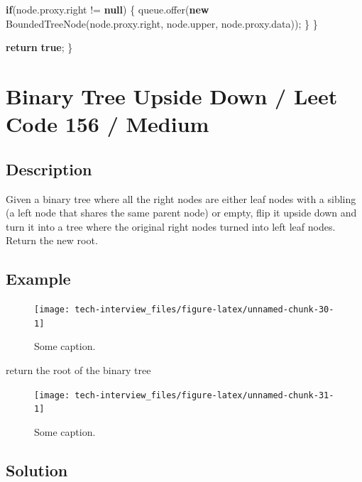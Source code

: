 \documentclass[]{book}
\newenvironment{Shaded}{\begin{snugshade}}{\end{snugshade}}
\newcommand{\FunctionTok}[1]{\textcolor[rgb]{0.00,0.00,0.00}{#1}}
\newcommand{\KeywordTok}[1]{\textcolor[rgb]{0.13,0.29,0.53}{\textbf{#1}}}
\newcommand{\NormalTok}[1]{#1}
\begin{document}
\begin{Shaded}
\begin{Highlighting}[]
        \KeywordTok{if}\NormalTok{(node.}\FunctionTok{proxy}\NormalTok{.}\FunctionTok{right}\NormalTok{ != }\KeywordTok{null}\NormalTok{) \{}
\NormalTok{            queue.}\FunctionTok{offer}\NormalTok{(}\KeywordTok{new} \FunctionTok{BoundedTreeNode}\NormalTok{(node.}\FunctionTok{proxy}\NormalTok{.}\FunctionTok{right}\NormalTok{, node.}\FunctionTok{upper}\NormalTok{, node.}\FunctionTok{proxy}\NormalTok{.}\FunctionTok{data}\NormalTok{));}
\NormalTok{        \}}
\NormalTok{    \}}

    \KeywordTok{return} \KeywordTok{true}\NormalTok{;}
\NormalTok{\}}
\end{Highlighting}
\end{Shaded}

\hypertarget{binary-tree-upside-down-leet-code-156-medium}{%
\section{Binary Tree Upside Down / Leet Code 156 / Medium}\label{binary-tree-upside-down-leet-code-156-medium}}

\hypertarget{description-69}{%
\subsection{Description}\label{description-69}}

Given a binary tree where all the right nodes are either leaf nodes with a sibling (a left node that shares
the same parent node) or empty, flip it upside down and turn it into a tree where the original right nodes
turned into left leaf nodes. Return the new root.

\hypertarget{example-66}{%
\subsection{Example}\label{example-66}}

\begin{figure}
\texttt{[image: tech-interview\_files/figure-latex/unnamed-chunk-30-1]} \caption{Some caption.}\label{fig:unnamed-chunk-30}
\end{figure}

return the root of the binary tree

\begin{figure}
\texttt{[image: tech-interview\_files/figure-latex/unnamed-chunk-31-1]} \caption{Some caption.}\label{fig:unnamed-chunk-31}
\end{figure}

\hypertarget{solution-46}{%
\subsection{Solution}\label{solution-46}}
\end{document}
